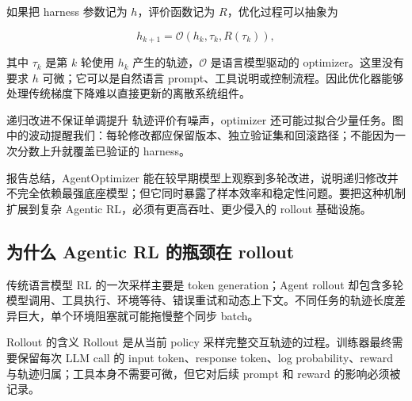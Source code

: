 

如果把 harness 参数记为 $h$，评价函数记为 $R$，优化过程可以抽象为

$$
h_{k+1}=\mathcal{O}\!\left(h_k,\tau_k,R(\tau_k)\right),
$$

其中 $\tau_k$ 是第 $k$ 轮使用 $h_k$ 产生的轨迹，$\mathcal{O}$ 是语言模型驱动的 optimizer。这里没有要求 $h$ 可微；它可以是自然语言 prompt、工具说明或控制流程。因此优化器能够处理传统梯度下降难以直接更新的离散系统组件。


\begin{warningbox}{递归改进不保证单调提升}
轨迹评价有噪声，optimizer 还可能过拟合少量任务。图中的波动提醒我们：每轮修改都应保留版本、独立验证集和回滚路径；不能因为一次分数上升就覆盖已验证的 harness。
\end{warningbox}

报告总结，AgentOptimizer 能在较早期模型上观察到多轮改进，说明递归修改并不完全依赖最强底座模型；但它同时暴露了样本效率和稳定性问题。要把这种机制扩展到复杂 Agentic RL，必须有更高吞吐、更少侵入的 rollout 基础设施。


\subsection{为什么 Agentic RL 的瓶颈在 rollout}

传统语言模型 RL 的一次采样主要是 token generation；Agent rollout 却包含多轮模型调用、工具执行、环境等待、错误重试和动态上下文。不同任务的轨迹长度差异巨大，单个环境阻塞就可能拖慢整个同步 batch。


\begin{knowledgebox}{Rollout 的含义}
Rollout 是从当前 policy 采样完整交互轨迹的过程。训练器最终需要保留每次 LLM call 的 input token、response token、log probability、reward 与轨迹归属；工具本身不需要可微，但它对后续 prompt 和 reward 的影响必须被记录。
\end{knowledgebox}

